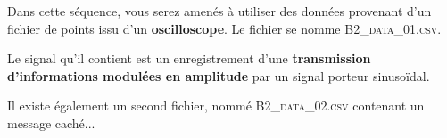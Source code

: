 

Dans cette séquence, vous serez amenés à utiliser des données provenant d'un fichier de points issu d'un \textbf{oscilloscope}. Le fichier se nomme \mbox{\textsc{B2\_data\_01.csv}}.

Le signal qu'il contient est un enregistrement d'une \textbf{transmission d'informations modulées en amplitude} par un signal porteur sinusoïdal.

\medskip

Il existe également un second fichier, nommé \mbox{\textsc{B2\_data\_02.csv}} contenant un message caché...


